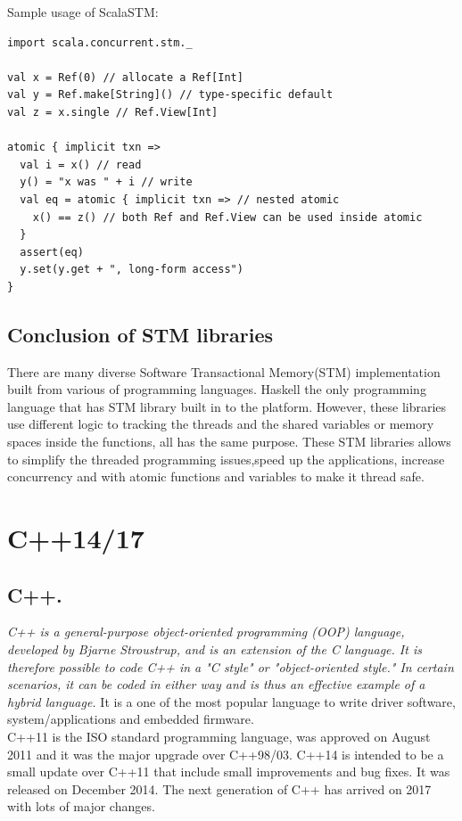 \documentclass[12pt]{article}
\begin{document}
Sample usage of ScalaSTM:
\begin{lstlisting}
import scala.concurrent.stm._

val x = Ref(0) // allocate a Ref[Int]
val y = Ref.make[String]() // type-specific default
val z = x.single // Ref.View[Int]

atomic { implicit txn =>
  val i = x() // read
  y() = "x was " + i // write
  val eq = atomic { implicit txn => // nested atomic
    x() == z() // both Ref and Ref.View can be used inside atomic
  }
  assert(eq)
  y.set(y.get + ", long-form access")
}
\end{lstlisting}

\subsection{Conclusion of STM libraries}
There are many diverse Software Transactional Memory(STM) implementation built from various of programming languages. Haskell the only programming language that has STM library built in to the platform. However, these libraries use different logic to tracking the threads and the shared variables or memory spaces inside the functions, all has the same purpose. These STM libraries allows to simplify the threaded programming issues,speed up the applications, increase concurrency and with atomic functions and variables to make it thread safe.

\section{C++14/17}
\subsection{C++.}
\textit{C++ is a general-purpose object-oriented programming (OOP) language, developed by Bjarne Stroustrup, and is an extension of the C language. It is therefore possible to code C++ in a "C style" or "object-oriented style." In certain scenarios, it can be coded in either way and is thus an effective example of a hybrid language.}\cite{Techopedia} It is a one of the most popular language to write driver software, system/applications and embedded firmware.\\

C++11 is the ISO standard programming language, was approved on August 2011 and it was the major upgrade over C++98/03. C++14 is intended to be a small update over C++11 that include small improvements and bug fixes. It was released on December 2014. The next generation of C++ has arrived on 2017 with lots of major changes.\\
\end{document}
